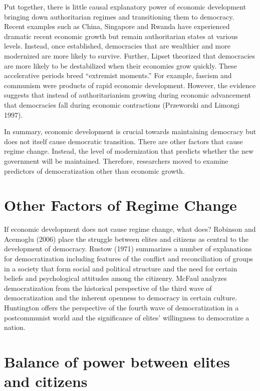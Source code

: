\documentclass[12pt,]{article}
\begin{document}
Put together, there is little causal explanatory power of economic
development bringing down authoritarian regimes and transitioning them
to democracy. Recent examples such as China, Singapore and Rwanda have
experienced dramatic recent economic growth but remain authoritarian
states at various levels. Instead, once established, democracies that
are wealthier and more modernized are more likely to survive. Further,
Lipset theorized that democracies are more likely to be destabilized
when their economies grow quickly. These accelerative periods breed
``extremist moments.'' For example, fascism and communism were products
of rapid economic development. However, the evidence suggests that
instead of authoritarianism growing during economic advancement that
democracies fall during economic contractions (Przeworski and Limongi
1997).

In summary, economic development is crucial towards maintaining
democracy but does not itself cause democratic transition. There are
other factors that cause regime change. Instead, the level of
modernization that predicts whether the new government will be
maintained. Therefore, researchers moved to examine predictors of
democratization other than economic growth.

\hypertarget{other-factors-of-regime-change}{%
\section{Other Factors of Regime
Change}\label{other-factors-of-regime-change}}

If economic development does not cause regime change, what does?
Robinson and Acemoglu (2006) place the struggle between elites and
citizens as central to the development of democracy. Rustow (1971)
summarizes a number of explanations for democratization including
features of the conflict and reconciliation of groups in a society that
form social and political structure and the need for certain beliefs and
psychological attitudes among the citizenry. McFaul analyzes
democratization from the historical perspective of the third wave of
democratization and the inherent openness to democracy in certain
culture. Huntington offers the perspective of the fourth wave of
democratization in a postcommunist world and the significance of elites'
willingness to democratize a nation.

\hypertarget{balance-of-power-between-elites-and-citizens}{%
\section{Balance of power between elites and
citizens}\label{balance-of-power-between-elites-and-citizens}}
\end{document}

